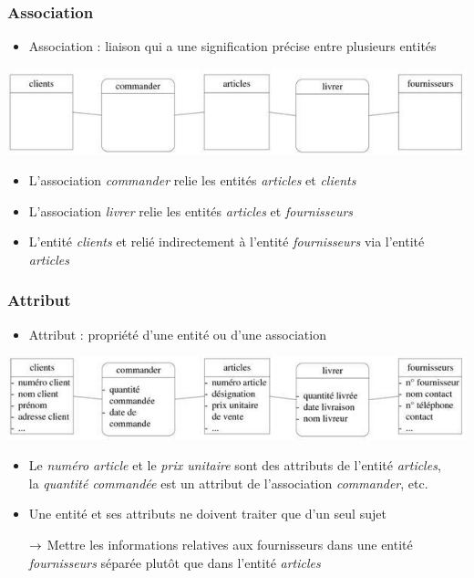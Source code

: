 \begin{frame}
  \frametitle{Association}
  \begin{itemize}
    \item Association : liaison qui a une signification précise entre plusieurs entités
  \end{itemize}
  \begin{center}
    \includegraphics[width=0.9\linewidth]{association.jpg}
  \end{center}
  \begin{itemize}
    \item L'association \emph{commander} relie les entités \emph{articles} et \emph{clients}
    \item L'association \emph{livrer} relie les entités \emph{articles} et \emph{fournisseurs}
    \item L'entité \emph{clients} et relié indirectement à l'entité \emph{fournisseurs} via l'entité
      \emph{articles}
  \end{itemize}
\end{frame}

\begin{frame}
  \frametitle{Attribut}
  \begin{itemize}
    \item Attribut : propriété d'une entité ou d'une association
  \end{itemize}
  \begin{center}
    \includegraphics[width=0.9\linewidth]{attribut.jpg}
  \end{center}
  \begin{itemize}
    \item Le \emph{numéro article} et le \emph{prix unitaire} sont des attributs de l'entité \emph{articles},\\
      la \emph{quantité commandée} est un attribut de l'association \emph{commander}, etc.
    \item Une entité et ses attributs ne doivent traiter que d'un seul sujet
    \item[$\rightarrow$] Mettre les informations relatives aux fournisseurs dans une entité \emph{fournisseurs} séparée
      plutôt que dans l'entité \emph{articles}
  \end{itemize}
\end{frame}

